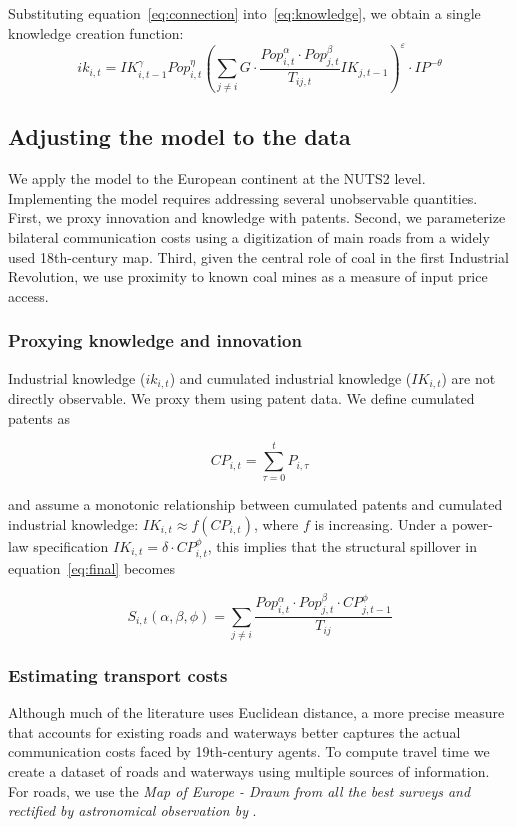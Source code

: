 \documentclass[letterpaper,12pt,leqno]{article}
\begin{document}
Substituting equation~\eqref{eq:connection} into~\eqref{eq:knowledge}, we obtain a single knowledge creation function:
\begin{equation}
  \label{eq:final}
  ik_{i,t} = IK_{i,t-1}^\gamma Pop_{i,t}^\eta \left( \sum_{j\neq i}G\cdot\frac{{Pop}_{i,t}^\alpha   \cdot   Pop_{j,t}^\beta}{T_{ij,t}}IK_{j,t-1} \right)^\varepsilon \cdot IP^{-\theta}
\end{equation}

\subsection{Adjusting the model to the data}
We apply the model to the European continent at the NUTS2 level.
Implementing the model requires addressing several unobservable quantities. First, we proxy innovation and knowledge with patents. Second, we parameterize bilateral communication costs using a digitization of main roads from a widely used 18th-century map. Third, given the central role of coal in the first Industrial Revolution, we use proximity to known coal mines as a measure of input price access.
\subsubsection*{Proxying knowledge and innovation}

Industrial knowledge (\(ik_{i,t}\)) and cumulated industrial knowledge (\(IK_{i,t}\)) are not directly observable. We proxy them using patent data. We define cumulated patents as

\begin{equation}
  CP_{i,t} = \sum_{\tau=0}^t P_{i,\tau}
\end{equation}

\noindent and assume a monotonic relationship between cumulated patents and cumulated industrial knowledge: \(IK_{i,t} \approx f(CP_{i,t})\), where \(f\) is increasing. Under a power-law specification \(IK_{i,t} = \delta \cdot CP_{i,t}^\phi\), this implies that the structural spillover in equation~\eqref{eq:final} becomes

\begin{equation}
  \label{eq:spillover_structural}
  S_{i,t}(\alpha, \beta, \phi) = \sum_{j \neq i} \frac{Pop_{i,t}^{\alpha} \cdot Pop_{j,t}^{\beta} \cdot CP_{j,t-1}^{\phi}}{T_{ij}}
\end{equation}

\subsubsection*{Estimating transport costs}
Although much of the literature uses Euclidean distance, a more precise measure that accounts for existing roads and waterways better captures the actual communication costs faced by 19th-century agents.
To compute travel time we create a dataset of roads and waterways using multiple sources of information. For roads, we use the \textit{Map of Europe - Drawn from all the best surveys and rectified by astronomical observation by} \citet{arrowsmith}.
\end{document}

